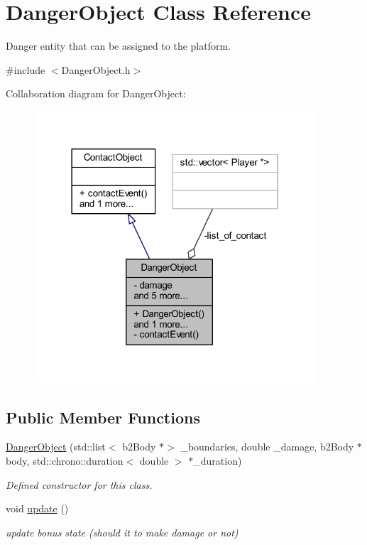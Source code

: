 \hypertarget{class_danger_object}{}\section{Danger\+Object Class Reference}
\label{class_danger_object}


Danger entity that can be assigned to the platform.  




{\ttfamily \#include $<$Danger\+Object.\+h$>$}



Collaboration diagram for Danger\+Object\+:
\nopagebreak
\begin{figure}[H]
\begin{center}
\leavevmode
\includegraphics[width=298pt]{class_danger_object__coll__graph}
\end{center}
\end{figure}
\subsection*{Public Member Functions}
\begin{DoxyCompactItemize}
\item 
\hyperlink{class_danger_object_a87186516066d7d47dcea87eec44ee616}{Danger\+Object} (std\+::list$<$ b2\+Body $\ast$$>$ \+\_\+boundaries, double \+\_\+damage, b2\+Body $\ast$body, std\+::chrono\+::duration$<$ double $>$ $\ast$\+\_\+duration)
\begin{DoxyCompactList}\small\item\em Defined constructor for this class. \end{DoxyCompactList}\item 
\mbox{\label{class_danger_object_a0c058336c21ee3e9b8fca876adda2dda}} 
void \hyperlink{class_danger_object_a0c058336c21ee3e9b8fca876adda2dda}{update} ()
\begin{DoxyCompactList}\small\item\em update bonus state (should it to make damage or not) \end{DoxyCompactList}\end{DoxyCompactItemize}
